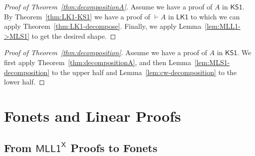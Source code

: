 \documentclass[conference,twosided,10pt]{IEEEtran}
\newcommand{\todo}[1]{{\color{red}     \noindent[\![\![{\bf TODO: }#1]\!]\!]}}
\theoremstyle{definition}
\newcommand*{\FOLK}{\mathsf{LK1}}
\newcommand*{\FOMLL}{\mathsf{MLL1^X}}
\newcommand*{\FOKS}{\mathsf{KS1}}
\newcommand{\sqn}[1]{\vdash#1}
\begin{document}
\begin{proof}[Proof of Theorem~\ref{thm:decompositionA}]
  Assume we have a proof of $A$ in $\FOKS$. By
  Theorem~\ref{thm:LK1-KS1} we have a proof of $\sqn A$ in $\FOLK$ to
  which we can apply Theorem~\ref{thm:LK1-decompose}. Finally, we
  apply Lemma~\ref{lem:MLL1->MLS1} to get the desired shape.
\end{proof}

\begin{proof}[Proof of Theorem~\ref{thm:decomposition}]
  Assume we have a proof of $A$ in $\FOKS$. We first apply
  Theorem~\ref{thm:decompositionA}, and then
  Lemma~\ref{lem:MLS1-decomposition} to the upper half and
  Lemma~\ref{lem:cw-decomposition} to the lower half.
\end{proof}


\section{Fonets and Linear Proofs}
\label{sec:linear}


\subsection{From $\FOMLL$ Proofs to Fonets}
\end{document}
